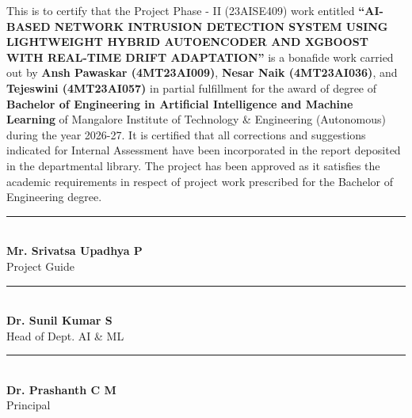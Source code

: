 \documentclass[12pt,a4paper]{report}
\begin{document}
{\small This is to certify that the Project Phase - II (23AISE409) work entitled \textbf{``AI-BASED NETWORK INTRUSION DETECTION SYSTEM USING LIGHTWEIGHT HYBRID AUTOENCODER AND XGBOOST WITH REAL-TIME DRIFT ADAPTATION''} is a bonafide work carried out by \textbf{Ansh Pawaskar (4MT23AI009)}, \textbf{Nesar Naik (4MT23AI036)}, and \textbf{Tejeswini (4MT23AI057)} in partial fulfillment for the award of degree of \textbf{Bachelor of Engineering in Artificial Intelligence and Machine Learning} of Mangalore Institute of Technology \& Engineering (Autonomous) during the year 2026-27. It is certified that all corrections and suggestions indicated for Internal Assessment have been incorporated in the report deposited in the departmental library. The project has been approved as it satisfies the academic requirements in respect of project work prescribed for the Bachelor of Engineering degree.}\par\vspace{1.2cm}

\noindent
\begin{minipage}[t]{0.48\textwidth}
    \centering
    \rule{5cm}{0.4pt}\\[0.3cm]
    \textbf{Mr. Srivatsa Upadhya P}\\
    Project Guide
\end{minipage}
\hfill
\begin{minipage}[t]{0.48\textwidth}
    \centering
    \rule{5cm}{0.4pt}\\[0.3cm]
    \textbf{Dr. Sunil Kumar S}\\
    Head of Dept. AI \& ML
\end{minipage}

\vspace{1.5cm}

\begin{center}
    \rule{5cm}{0.4pt}\\[0.3cm]
    \textbf{Dr. Prashanth C M}\\
    Principal
\end{center}

\clearpage
\thispagestyle{empty}

\end{document}
